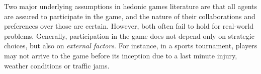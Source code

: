 \documentclass[letterpaper]{article} %
\begin{document}
Two major underlying assumptions in hedonic games literature are that all agents are assured to participate in the game, and the nature of their collaborations and preferences over those are certain. However, both often fail to hold for real-world problems. Generally, participation in the game does not depend only on strategic choices, but also on \textit{external factors}. For instance, in a sports tournament, players may not arrive to the game before its inception due to a last minute injury, weather conditions or traffic jams. %

\end{document}
